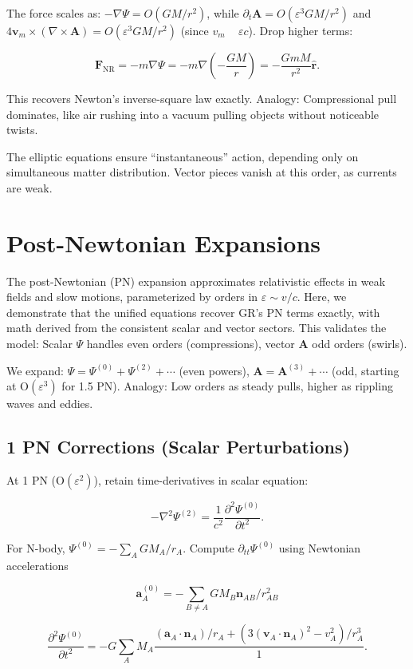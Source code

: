 \documentclass{article}
\begin{document}
The force scales as: $-\nabla \Psi = O(GM/r^2)$, while $\partial_t \mathbf{A} = O(\varepsilon^3 GM/r^2)$ and $4 \mathbf{v}_m \times (\nabla \times \mathbf{A}) = O(\varepsilon^3 GM/r^2)$ (since $v_m$ ~ $\varepsilon c$). Drop higher terms:

\[
\mathbf{F}_{\text{NR}} = -m \nabla \Psi = -m \nabla \left(-\frac{GM}{r}\right) = - \frac{G m M}{r^2} \hat{\mathbf{r}}.
\]

This recovers Newton's inverse-square law exactly. Analogy: Compressional pull dominates, like air rushing into a vacuum pulling objects without noticeable twists.

The elliptic equations ensure ``instantaneous'' action, depending only on simultaneous matter distribution. Vector pieces vanish at this order, as currents are weak.

\section{Post-Newtonian Expansions}

The post-Newtonian (PN) expansion approximates relativistic effects in weak fields and slow motions, parameterized by orders in $\varepsilon \sim v/c$. Here, we demonstrate that the unified equations recover GR's PN terms exactly, with math derived from the consistent scalar and vector sectors. This validates the model: Scalar $\Psi$ handles even orders (compressions), vector $\mathbf{A}$ odd orders (swirls).

We expand: $\Psi = \Psi^{(0)} + \Psi^{(2)} + \cdots$ (even powers), $\mathbf{A} = \mathbf{A}^{(3)} + \cdots$ (odd, starting at O$(\varepsilon^3)$ for 1.5 PN). Analogy: Low orders as steady pulls, higher as rippling waves and eddies.

\subsection{1 PN Corrections (Scalar Perturbations)}

At 1 PN (O$(\varepsilon^2)$), retain time-derivatives in scalar equation:

\[
- \nabla^2 \Psi^{(2)} = \frac{1}{c^2} \frac{\partial^2 \Psi^{(0)}}{\partial t^2}.
\]

For N-body, $\Psi^{(0)} = - \sum_A GM_A / r_A$. Compute $\partial_{tt} \Psi^{(0)}$ using Newtonian accelerations

\[
\mathbf{a}_A^{(0)} = - \sum_{B \neq A} GM_B \mathbf{n}_{AB} / r_{AB}^2
\]

\[
\frac{\partial^2 \Psi^{(0)}}{\partial t^2} = - G \sum_A M_A \frac{(\mathbf{a}_A \cdot \mathbf{n}_A) / r_A + (3 (\mathbf{v}_A \cdot \mathbf{n}_A)^2 - v_A^2) / r_A^3 }{1}.
\]
\end{document}

